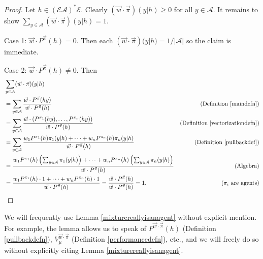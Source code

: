 \documentclass[twoside]{article}
\begin{document}
\begin{proof}
    Let $h\in(\mathcal E\mathcal A)^*\mathcal E$.
    Clearly $(\vec w\cdot\vec\pi)(y|h)\geq 0$ for all $y\in\mathcal A$.
    It remains to show
    $\sum_{y\in\mathcal A}(\vec w\cdot\vec\pi)(y|h)=1$.

    Case 1: $\vec w\cdot {P^{\vec\pi}}(h)=0$. Then
    each $(\vec w\cdot\vec\pi)(y|h)=1/|\mathcal A|$ so the
    claim is immediate.

    Case 2: $\vec w\cdot {P^{\vec\pi}}(h)\not=0$. Then
    \begin{align*}
        &{} \sum_{y\in\mathcal A}(\vec w\cdot\vec\pi)(y|h)\\
            &= \sum_{y\in\mathcal A}
                \frac{\vec w\cdot {P^{\vec\pi}}(hy)}{\vec w\cdot {P^{\vec\pi}}(h)}
                &\mbox{(Definition \ref{maindefn})}\\
            &= \sum_{y\in\mathcal A}
                \frac
                {\vec w\cdot(P^{\pi_1}(hy),\ldots,P^{\pi_n}(hy))}
                {\vec w\cdot {P^{\vec\pi}}(h)}
                &\mbox{(Definition \ref{vectorizationdefn})}\\
            &= \sum_{y\in\mathcal A}
                \frac
                {w_1 P^{\pi_1}(h)\pi_1(y|h)+\cdots+w_n P^{\pi_n}(h)\pi_n(y|h)}
                {\vec w\cdot {P^{\vec\pi}}(h)}
                &\mbox{(Definition \ref{pullbackdef})}\\
            &= \frac{
                w_1 P^{\pi_1}(h)\left(\mbox{$\sum_{y\in\mathcal A}\pi_1(y|h)$}\right)
                +\cdots+
                w_n P^{\pi_n}(h)\left(\mbox{$\sum_{y\in\mathcal A}\pi_n(y|h)$}\right)
                }
                {\vec w\cdot {P^{\vec\pi}}(h)}
                &\mbox{(Algebra)}\\
            &= \frac
                {w_1 P^{\pi_1}(h)\cdot 1 + \cdots + w_n P^{\pi_n}(h)\cdot1}
                {\vec w\cdot {P^{\vec\pi}}(h)}
                =\frac{\vec w\cdot {P^{\vec\pi}}(h)}{\vec w\cdot {P^{\vec\pi}}(h)}=1.
                &\mbox{($\pi_i$ are agents)}
    \end{align*}
\end{proof}

We will frequently use Lemma \ref{mixturereallyisanagent} without explicit mention.
For example, the lemma allows us to speak of $P^{\vec w\cdot \vec\pi}(h)$
(Definition \ref{pullbackdefn}), $V^{\vec w\cdot\vec\pi}_{\mu}$
(Definition \ref{performancedefn}), etc., and we will freely do so without
explicitly citing Lemma \ref{mixturereallyisanagent}.
\end{document}
